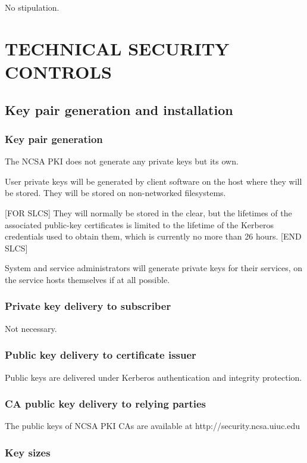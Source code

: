 \documentclass[10pt]{article}
\begin{document}
No stipulation.

\section{TECHNICAL SECURITY CONTROLS}

\subsection{Key pair generation and installation}
\subsubsection{Key pair generation}

The NCSA PKI does not generate any private keys but its own.

User private keys will be generated by client software on the host
where they will be stored.  They will be stored on non-networked
filesystems.

[FOR SLCS]
 They will normally be stored in the clear, but the
lifetimes of the associated public-key certificates is limited to the
lifetime of the Kerberos credentials used to obtain them, which is
currently no more than 26 hours.
[END SLCS]

System and service administrators will generate private keys for their
services, on the service hosts themselves if at all possible.


\subsubsection{Private key delivery to subscriber}

Not necessary.

\subsubsection{Public key delivery to certificate issuer}

Public keys are delivered under Kerberos authentication and integrity
protection.

\subsubsection{CA public key delivery to relying parties}

The public keys of NCSA PKI CAs are available at
http://security.ncsa.uiuc.edu

\subsubsection{Key sizes}
\end{document}

